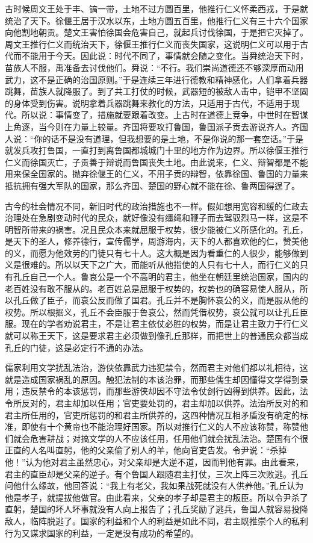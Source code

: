 \documentclass[12pt,UTF-8,openany,a4]{ctexbook}
\begin{document}
\begin{large}
    古时候周文王处于丰、镐一带，土地不过方圆百里，他推行仁义怀柔西戎，于是就统治了天下。徐偃王居于汉水以东，土地方圆五百里，他推行仁义有三十六个国家向他割地朝贡。楚文王害怕徐国会危害自己，就起兵讨伐徐国，于是把它灭掉了。周文王推行仁义而统治天下，徐偃王推行仁义而丧失国家，这说明仁义可以用于古代而不能用于今天。因此说：时代不同了，事情就会随之变化。当舜统治天下时，苗族人不服，禹准备去讨伐他们。舜说：“不行。我们崇尚道德还不够深厚而动用武力，这不是正确的治国原则。”于是连续三年进行德教和精神感化，人们拿着兵器跳舞，苗族人就降服了。到了共工打仗的时候，武器短的被敌人击中，铠甲不坚固的身体受到伤害。说明拿着兵器跳舞来教化的方法，只适用于古代，不适用于现代。所以说：事情变了，措施就要跟着改变。上古时在道德上竞争，中世时在智谋上角逐，当今则在力量上较量。齐国将要攻打鲁国，鲁国派子贡去游说齐人。齐国人说：“你的话不是没有道理，但我想要的是土地，不是你说的那一套空话。”于是就发兵攻打鲁国，一直打到离鲁国都城城门十里的地方作为边界。所以徐偃王推行仁义而徐国灭亡，子贡善于辩说而鲁国丧失土地。由此说来，仁义、辩智都是不能用来保全国家的。抛弃徐偃王的仁义，不用子贡的辩智，依靠徐国、鲁国的力量来抵抗拥有强大军队的国家，那么齐国、楚国的野心就不能在徐、鲁两国得逞了。
    
    古今的社会情况不同，新旧时代的政治措施也不一样。假如想用宽容和缓的仁政去治理处在急剧变动时代的民众，就好像没有缰绳和鞭子而去驾驭烈马一样，这是不明智所带来的祸害。况且民众本来就屈服于权势，很少能被仁义所感化的。孔丘，是天下的圣人，修养德行，宣传儒学，周游海内，天下的人都喜欢他的仁，赞美他的义，而愿为他效劳的门徒只有七十人。这大概是因为看重仁的人很少，能够做到义是很难的。所以以天下之广大，而能听从他指使的人只有七十人，而行仁义的只有孔丘自己一个人。鲁哀公是一个不高明的君主，他坐在朝廷里统治国家，国内的老百姓没有敢不服从的。老百姓总是屈服于权势的，权势也的确容易使人服从，所以孔丘做了臣子，而哀公反而做了国君。孔丘并不是胸怀哀公的义，而是服从他的权势。所以根据义，孔丘不会臣服于鲁哀公，然而凭借权势，哀公就可以让孔丘臣服。现在的学者劝说君主，不是让君主依仗必胜的权势，而是让君主致力于行仁义就可以称王天下，这是要求君主必须做到像孔丘那样，而把世上的普通民众都当成孔丘的门徒，这是必定行不通的办法。
    
    儒家利用文学扰乱法治，游侠依靠武力违犯禁令，然而君主对他们都以礼相待，这就是造成国家祸乱的原因。触犯法制的本该治罪，而那些儒生却因懂得文学得到录用；违反禁令的本该惩罚，而那些游侠却因不守法令仗剑行凶得到供养。因此，法令所反对的，君主却加以任用；官吏要处罚的，君主却加以供养。法治所反对的和君主所任用的，官吏所惩罚的和君主所供养的，这四种情况互相矛盾没有确定的标准，即使有十个黄帝也不能治理好国家。所以对推行仁义的人不应该称赞，称赞他们就会危害耕战；对搞文学的人不应该任用，任用他们就会扰乱法治。楚国有个很正直的人名叫直躬，他的父亲偷了别人的羊，他向官吏告发。令尹说：“杀掉他！”认为他对君主虽然忠心，对父亲却是大逆不道，因而判他有罪。由此看来，君主的直臣却是父亲的逆子。有个鲁国人跟随君主打仗，三次上阵三次败逃。孔丘问他什么缘故，他回答说：“我上有老父，我如果战死就没有人供养他。”孔丘认为他是孝子，就提拔他做官。由此看来，父亲的孝子却是君主的叛臣。所以令尹杀了直躬，楚国的坏人坏事就没有人向上报告了；孔丘奖励了逃兵，鲁国人就容易投降敌人，临阵脱逃了。国家的利益和个人的利益是如此不同，君主既推崇个人的私利行为又谋求国家的利益，一定是没有成功的希望的。
    
\end{large}
\end{document}
